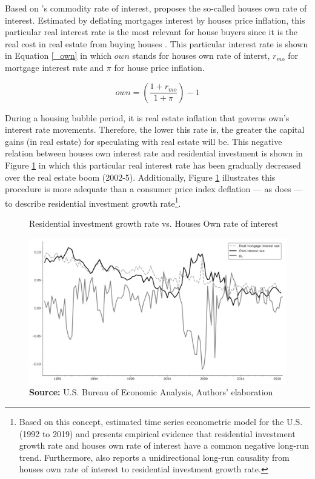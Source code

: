 \documentclass[12pt]{article}
\begin{document}
Based on \citeauthor*{Sraffa_Own_1932}'s \citeyear{Sraffa_Own_1932} commodity rate of interest, \textcite{teixeira_crescimento_2015} proposes the so-called houses own rate of interest.
Estimated by deflating mortgages interest by houses price inflation, this particular real interest rate is the most relevant for house buyers since it is the real cost in real estate from buying houses  \cite[p.~53]{teixeira_crescimento_2015}.
This particular interest rate is shown in Equation \ref{_own} in which \(own\) stands for houses own rate of interst, \(r_{mo}\) for mortgage interest rate and \(\pi\) for house price inflation.


\begin{equation}
\label{_own}
own = \left(\frac{1+r_{mo}}{1+\pi}\right) -1
\end{equation}

During a housing bubble period, it is real estate inflation that governs own's interest rate movements. Therefore, the lower this rate is, the greater the capital gains (in real estate) for speculating with real estate will be. This negative relation between houses own interest rate and residential investment is shown in Figure \ref{propria_investo} in which this particular real interest rate has been gradually decreased over the real estate boom (2002-5).
Additionally, Figure \ref{propria_investo} illustrates this procedure is more adequate than a consumer price index deflation --- as \textcite[p.~143--6]{fair_macroeconometric_2013} does --- to describe residential investment growth rate\footnote{Based on this concept, \textcite{petrini_demanda_2019} estimated time series econometric model for the U.S. (1992 to 2019) and presents empirical evidence that residential investment growth rate and houses own rate of interest have a common negative long-run trend.  Furthermore, \textcite{petrini_demanda_2019} also reports a unidirectional long-run causality from houses own rate of interest to residential investment growth rate.}.


\begin{figure}[htb]
	\centering
	\caption{Residential investment growth rate vs. Houses Own rate of interest}
	\label{propria_investo}
	\includegraphics[width=.8\textwidth]{./figs/Own_gI}
	\caption*{\textbf{Source:} U.S. Bureau of Economic Analysis, Authors' elaboration}
\end{figure}
\end{document}
